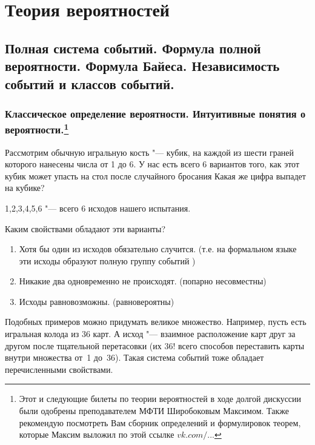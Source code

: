 \part{Теория вероятностей}

\chapter{Полная система событий. Формула полной вероятности. Формула Байеса. Независимость событий и классов событий.}

\section[Классическое определение вероятности. Интуитивные понятия о вероятности.]{Классическое определение вероятности. Интуитивные понятия о вероятности.\protect\footnote{Этот и следующие билеты по теории вероятностей в ходе долгой дискуссии были одобрены преподавателем МФТИ Широбоковым Максимом. Также рекомендую посмотреть Вам сборник определений и формулировок теорем, которые Максим выложил по этой ссылке \href{https://vk.com/shmaxg?w=wall5284431_903}{$vk.com/...$}}}

Рассмотрим обычную игральную кость "--- кубик, на каждой из шести граней которого нанесены числа от 1 до 6. У нас есть всего 6 вариантов того, как этот кубик может упасть на стол после случайного бросания Какая же цифра выпадет на кубике? 
\begin{center}
1,2,3,4,5,6 "--- всего 6 исходов нашего испытания.
\end{center}
Каким свойствами обладают эти варианты?
\begin{enumerate}
\item Хотя бы один из исходов обязательно случится. (т.е. на формальном языке эти исходы образуют полную группу событий )
\item Никакие два одновременно не происходят. (попарно несовместны)
\item Исходы равновозможны. (равновероятны)
\end{enumerate}

Подобных примеров можно придумать великое множество. Например, пусть есть игральная колода из 36 карт. А исход "--- взаимное расположение карт друг за другом после тщательной перетасовки (их 36! всего способов переставить карты внутри множества от~1 до~36). Такая система событий тоже обладает перечисленными свойствами.

